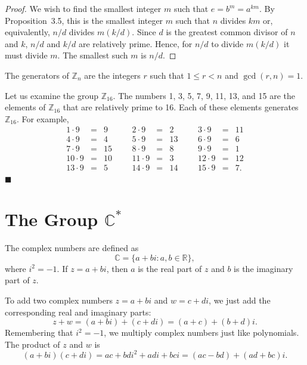  
\begin{proof}
We wish to find the smallest integer $m$ such that $e = b^m = a^{km}$.
By Proposition~3.5, this is the smallest integer $m$ such that
$n$ divides $km$ or, equivalently, $n/d$ divides $m(k/d)$.  Since $d$ is
the greatest common divisor of $n$ and $k$, $n/d$ and $k/d$ are
relatively prime. Hence, for $n/d$ to divide $m(k/d)$ it must divide
$m$.  The smallest such $m$ is $n/d$. 
\end{proof}
 
 
\begin{corollary}
The generators of ${\mathbb Z}_n$ are the integers $r$ such that $1 \leq
r < n$ and $\gcd(r,n) =  1$. 
\end{corollary}
 
 
Let us examine the group ${\mathbb Z}_{16}$.  The numbers 1, 3, 5, 7, 9,
11, 13, and 15 are the elements of ${\mathbb Z}_{16}$ that are relatively
prime to 16.  Each of these elements generates ${\mathbb Z}_{16}$. For
example, 
$$
\begin{array}{rclccrclccrcl}
1 \cdot 9  & = & 9  &&& 2 \cdot 9  & = & 2  &&&	3 \cdot 9  & = & 11 \\
4 \cdot 9  & = & 4  &&& 5 \cdot 9  & = & 13 &&&	6 \cdot 9  & = & 6  \\
7 \cdot 9  & = & 15 &&& 8 \cdot 9  & = & 8  &&&	9 \cdot 9  & = & 1  \\
10 \cdot 9 & = & 10 &&& 11 \cdot 9 & = & 3  &&&	12 \cdot 9 & = & 12 \\
13 \cdot 9 & = & 5  &&& 14 \cdot 9 & = & 14 &&&	15 \cdot 9 & = & 7.
\end{array}
$$
\hspace{\fill} $\blacksquare$
 
 
\section{The Group ${\mathbb C}^\ast$}
 
 
The {\bfi complex numbers} are defined as
$$
{\mathbb C} = \{ a + bi : a, b \in {\mathbb R} \},
$$
where $i^2 = -1$.  If $z=a+bi$, then $a$ is the {\bfi real part} of $z$
and $b$ is the {\bfi imaginary part} of $z$. 
 
 
To add two complex numbers $z=a+bi$ and $w= c+di$, we just
add the corresponding real and imaginary parts:
$$
z+w=(a + bi ) + (c + di)  =  (a+c) + (b+d)i.
$$
Remembering that $i^2 = -1$,  we multiply complex numbers just like
polynomials. The product of $z$ and $w$ is 
$$
(a + bi )(c + di)  =   ac + bdi^2 + adi + bci =  (ac -bd) +
(ad + bc)i.
$$
 
